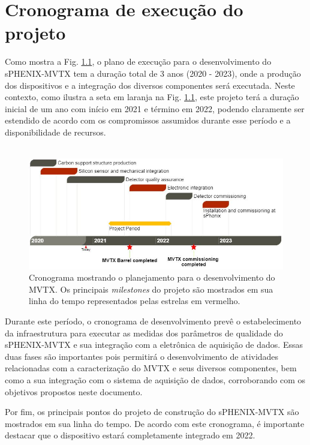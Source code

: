 \chapter{Cronograma de execução do projeto}

Como mostra a Fig. \ref{crono}, o plano de execução para o desenvolvimento do sPHENIX-MVTX tem a duração total de 3 anos (2020 - 2023), onde a produção dos dispositivos e a integração dos diversos componentes será executada. Neste contexto, como ilustra a seta em laranja na Fig. \ref{crono}, este projeto terá a duração inicial de um ano com início em 2021 e término em 2022, podendo claramente ser estendido de acordo com os compromissos assumidos durante esse período e a disponibilidade de recursos.
\\
\\
\begin{figure}[!h]
\centering
\includegraphics[width=15.0cm]{assets/cronograma.JPG}
\caption{Cronograma mostrando o planejamento para o desenvolvimento do MVTX. Os principais \textit{milestones} do projeto são mostrados em sua linha do tempo representados pelas estrelas em vermelho.}
\label{crono}
\end{figure}

Durante este período, o cronograma de desenvolvimento prevê o estabelecimento da infraestrutura para executar as medidas dos parâmetros de qualidade do sPHENIX-MVTX e sua integração com a eletrônica de aquisição de dados. Essas duas fases são importantes pois permitirá o desenvolvimento de atividades relacionadas com a caracterização do MVTX e seus diversos componentes, bem como a sua integração com o sistema de aquisição de dados, corroborando com os objetivos propostos neste documento. 

Por fim, os principais pontos do projeto de construção do sPHENIX-MVTX são mostrados em sua linha do tempo. De acordo com este cronograma, é importante destacar que o dispositivo estará completamente integrado em 2022.

